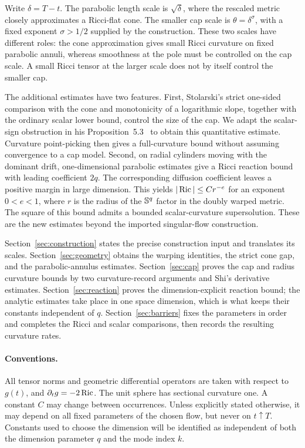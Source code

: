 Write \(\delta=T-t\). The parabolic length scale is \(\sqrt\delta\),
where the rescaled metric closely approximates a Ricci-flat cone.
The smaller cap scale is \(\theta=\delta^\sigma\), with a fixed
exponent \(\sigma>1/2\) supplied by the construction. These two
scales have different roles: the cone approximation gives small Ricci
curvature on fixed parabolic annuli, whereas smoothness at the pole must
be controlled on the cap scale. A small Ricci tensor at the larger scale
does not by itself control the smaller cap.

The additional estimates have two features. First, Stolarski's strict
one-sided comparison with the cone and monotonicity of a logarithmic
slope, together with the ordinary scalar lower bound, control the size of
the cap. We adapt the scalar-sign obstruction in his
Proposition~5.3~\cite{Stolarski2019} to obtain this quantitative estimate.
Curvature
point-picking then gives a full-curvature bound without assuming convergence
to a cap model. Second, on radial cylinders moving with the dominant drift,
one-dimensional parabolic estimates give a Ricci reaction bound with leading
coefficient \(2q\). The corresponding diffusion coefficient leaves a positive
margin in large dimension. This yields
\( |\operatorname{Ric}|\le Cr^{-e}\) for an exponent \(0<e<1\), where \(r\) is
the radius of the \(\mathbb S^q\) factor in the doubly warped metric.
The square of this bound admits a bounded scalar-curvature supersolution.
These are the new estimates beyond the imported singular-flow construction.

Section~\ref{sec:construction} states the precise construction input and
translates its scales. Section~\ref{sec:geometry} obtains the warping
identities, the strict cone gap, and the parabolic-annulus estimates.
Section~\ref{sec:cap} proves the cap and radius curvature bounds by two
curvature-record arguments and Shi's derivative estimates.
Section~\ref{sec:reaction} proves the dimension-explicit reaction bound;
the analytic estimates take place in one space dimension, which is what
keeps their constants independent of \(q\).
Section~\ref{sec:barriers} fixes the parameters in order and completes
the Ricci and scalar comparisons, then records the resulting curvature rates.

\paragraph{Conventions.}
All tensor norms and geometric differential operators are taken with respect
to \(g(t)\), and \(\partial_t g=-2\operatorname{Ric}\).
The unit sphere has sectional curvature one. A constant \(C\) may change
between occurrences. Unless explicitly stated otherwise, it may depend on
all fixed parameters of the chosen flow, but never on \(t\uparrow T\).
Constants used to choose the dimension will be identified as independent
of both the dimension parameter \(q\) and the mode index \(k\).
